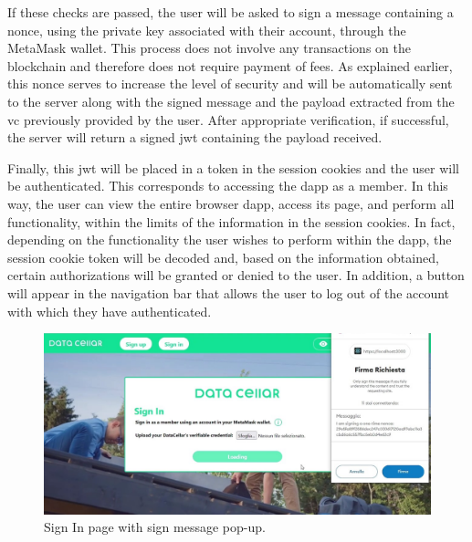 

If these checks are passed, the user will be asked to sign a message containing a \gls{nonce}, using the private key associated with their account, through the MetaMask wallet. 
This process does not involve any transactions on the blockchain and therefore does not require payment of fees. As explained earlier, this \gls{nonce} serves to increase the 
level of security and will be automatically sent to the server along with the signed message and the payload extracted from the \gls{vc} previously provided by the user. After 
appropriate verification, if successful, the server will return a signed \gls{jwt} containing the payload received.

Finally, this \gls{jwt} will be placed in a token in the session cookies and the user will be authenticated. This corresponds to accessing the \gls{dapp} as a member. In this 
way, the user can view the entire browser \gls{dapp}, access its page, and perform all functionality, within the limits of the information in the session cookies. In fact, 
depending on the functionality the user wishes to perform within the \gls{dapp}, the session cookie token will be decoded and, based on the information obtained, certain 
authorizations will be granted or denied to the user. In addition, a button will appear in the navigation bar that allows the user to log out of the account with which they have authenticated.

\begin{figure}[h]  
  \centering
  \includegraphics[width=1\textwidth]{Images/c6_3.jpg} 
  \caption{Sign In page with sign message pop-up.}
\end{figure}

